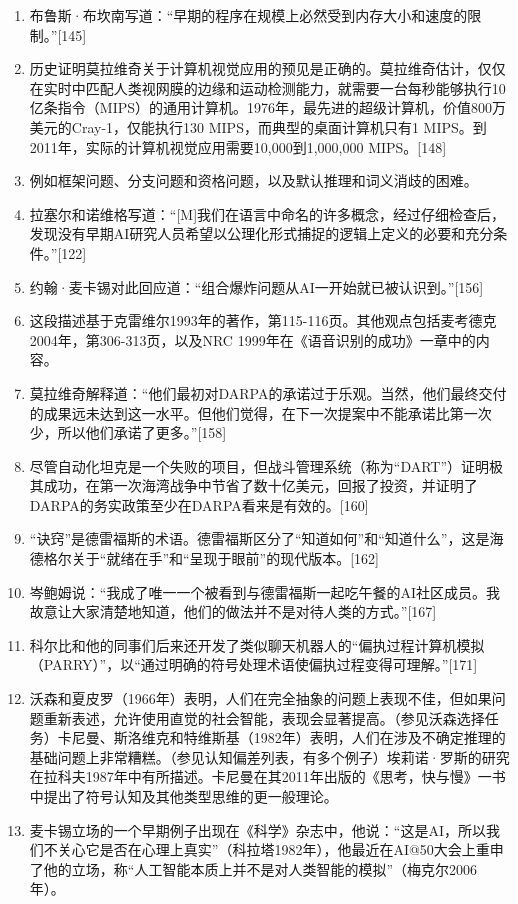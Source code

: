 \begin{enumerate}
\item 布鲁斯·布坎南写道：“早期的程序在规模上必然受到内存大小和速度的限制。”[145]  
\item 历史证明莫拉维奇关于计算机视觉应用的预见是正确的。莫拉维奇估计，仅仅在实时中匹配人类视网膜的边缘和运动检测能力，就需要一台每秒能够执行10亿条指令（MIPS）的通用计算机。1976年，最先进的超级计算机，价值800万美元的Cray-1，仅能执行130 MIPS，而典型的桌面计算机只有1 MIPS。到2011年，实际的计算机视觉应用需要10,000到1,000,000 MIPS。[148]
\item 例如框架问题、分支问题和资格问题，以及默认推理和词义消歧的困难。
\item 拉塞尔和诺维格写道：“[M]我们在语言中命名的许多概念，经过仔细检查后，发现没有早期AI研究人员希望以公理化形式捕捉的逻辑上定义的必要和充分条件。”[122]  
\item 约翰·麦卡锡对此回应道：“组合爆炸问题从AI一开始就已被认识到。”[156]  
\item 这段描述基于克雷维尔1993年的著作，第115-116页。其他观点包括麦考德克2004年，第306-313页，以及NRC 1999年在《语音识别的成功》一章中的内容。  
\item 莫拉维奇解释道：“他们最初对DARPA的承诺过于乐观。当然，他们最终交付的成果远未达到这一水平。但他们觉得，在下一次提案中不能承诺比第一次少，所以他们承诺了更多。”[158]  
\item 尽管自动化坦克是一个失败的项目，但战斗管理系统（称为“DART”）证明极其成功，在第一次海湾战争中节省了数十亿美元，回报了投资，并证明了DARPA的务实政策至少在DARPA看来是有效的。[160]  
\item “诀窍”是德雷福斯的术语。德雷福斯区分了“知道如何”和“知道什么”，这是海德格尔关于“就绪在手”和“呈现于眼前”的现代版本。[162]
\item 岑鲍姆说：“我成了唯一一个被看到与德雷福斯一起吃午餐的AI社区成员。我故意让大家清楚地知道，他们的做法并不是对待人类的方式。”[167]  
\item 科尔比和他的同事们后来还开发了类似聊天机器人的“偏执过程计算机模拟（PARRY）”，以“通过明确的符号处理术语使偏执过程变得可理解。”[171]  
\item 沃森和夏皮罗（1966年）表明，人们在完全抽象的问题上表现不佳，但如果问题重新表述，允许使用直觉的社会智能，表现会显著提高。（参见沃森选择任务）卡尼曼、斯洛维克和特维斯基（1982年）表明，人们在涉及不确定推理的基础问题上非常糟糕。（参见认知偏差列表，有多个例子）埃莉诺·罗斯的研究在拉科夫1987年中有所描述。卡尼曼在其2011年出版的《思考，快与慢》一书中提出了符号认知及其他类型思维的更一般理论。  
\item 麦卡锡立场的一个早期例子出现在《科学》杂志中，他说：“这是AI，所以我们不关心它是否在心理上真实”（科拉塔1982年），他最近在AI@50大会上重申了他的立场，称“人工智能本质上并不是对人类智能的模拟”（梅克尔2006年）。

\end{enumerate}
